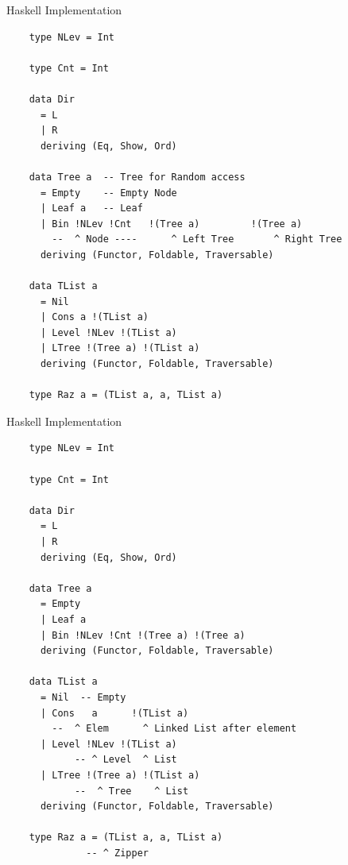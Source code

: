 \documentclass{beamer}
\begin{document}
\begin{frame}[fragile]{Haskell Implementation}

  \begin{verbatim}
    type NLev = Int

    type Cnt = Int

    data Dir
      = L
      | R
      deriving (Eq, Show, Ord)

    data Tree a  -- Tree for Random access
      = Empty    -- Empty Node
      | Leaf a   -- Leaf
      | Bin !NLev !Cnt   !(Tree a)         !(Tree a)
        --  ^ Node ----      ^ Left Tree       ^ Right Tree
      deriving (Functor, Foldable, Traversable)

    data TList a
      = Nil
      | Cons a !(TList a)
      | Level !NLev !(TList a)
      | LTree !(Tree a) !(TList a)
      deriving (Functor, Foldable, Traversable)

    type Raz a = (TList a, a, TList a)
  \end{verbatim}

\end{frame}

\begin{frame}[fragile]{Haskell Implementation}

  \begin{verbatim}
    type NLev = Int

    type Cnt = Int

    data Dir
      = L
      | R
      deriving (Eq, Show, Ord)

    data Tree a
      = Empty
      | Leaf a
      | Bin !NLev !Cnt !(Tree a) !(Tree a)
      deriving (Functor, Foldable, Traversable)

    data TList a
      = Nil  -- Empty
      | Cons   a      !(TList a)
        --  ^ Elem      ^ Linked List after element
      | Level !NLev !(TList a)
            -- ^ Level  ^ List
      | LTree !(Tree a) !(TList a)
            --  ^ Tree    ^ List
      deriving (Functor, Foldable, Traversable)

    type Raz a = (TList a, a, TList a)
              -- ^ Zipper
  \end{verbatim}
\end{frame}
\end{document}
